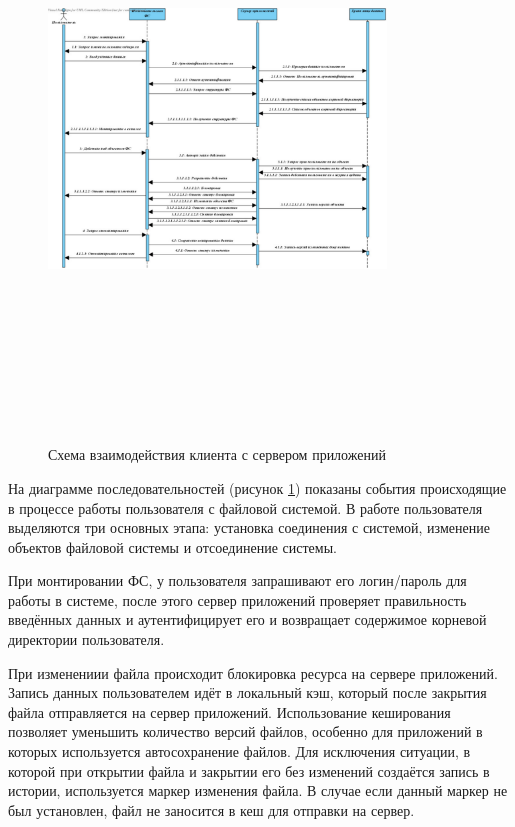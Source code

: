 \documentclass[utf8,usehyperref,12pt]{G7-32}
\begin{document}
\begin{figure}[ht]
   \centering%
   \includegraphics[height=160mm, width=0.8\textwidth, clip, keepaspectratio]{pictures/client_sequencs}
   \caption{Схема взаимодействия клиента с сервером приложений}\label{fig:client_sequence}
 \end{figure}

На диаграмме последовательностей (рисунок \ref{fig:client_sequence}) показаны события происходящие в процессе работы пользователя с файловой системой. В работе пользователя выделяются три основных этапа: установка соединения с системой, изменение объектов файловой системы и отсоединение системы. 

При монтировании ФС, у пользователя запрашивают его логин/пароль для работы в системе, после этого сервер приложений проверяет правильность введённых данных и аутентифицирует его и возвращает содержимое корневой директории пользователя.

При изменениии файла происходит блокировка ресурса на сервере приложений. Запись данных пользователем идёт в локальный кэш, который после закрытия файла отправляется на сервер приложений. Использование кеширования позволяет уменьшить количество версий файлов, особенно для приложений в которых используется автосохранение файлов. Для исключения ситуации, в которой при открытии файла и закрытии его без изменений создаётся запись в истории, используется маркер изменения файла. В случае если данный маркер не был установлен, файл не заносится в кеш для отправки на сервер.
\end{document}
